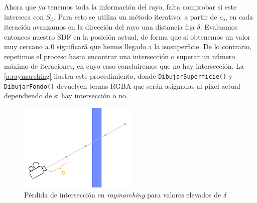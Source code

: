 Ahora que ya tenemos toda la información del rayo, falta comprobar si este interseca con $S_{\phi}$. Para esto se utiliza un método iterativo: a partir de $c_o$, en cada iteración avanzamos en la dirección del rayo una distancia fija $\delta$. Evaluamos entonces nuestro SDF en la posición actual, de forma que si obtenemos un valor muy cercano a $0$ significará que hemos llegado a la isosuperficie. De lo contrario, repetimos el proceso hasta encontrar una intersección o superar un número máximo de iteraciones, en cuyo caso concluiremos que no hay intersección. La \autoref{a:raymarching} ilustra este procedimiento, donde \texttt{DibujarSuperficie()} y \texttt{DibujarFondo()} devuelven ternas RGBA que serán asignadas al píxel actual dependiendo de si hay intersección o no.\newline

\begin{figure}[ht!]
    \centering
    \includegraphics[width=0.5\textwidth]{Plantilla-TFG-master/img/miss.png}
    \caption{Pérdida de intersección en \textit{raymarching} para valores elevados de $\delta$}
    \label{fig:miss}
\end{figure}

